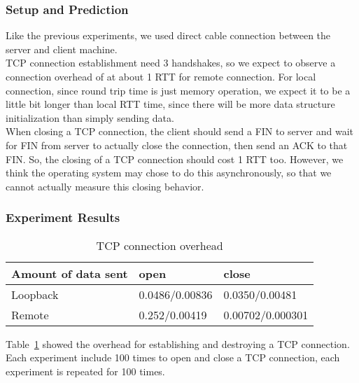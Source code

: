 \documentclass{article} %
\begin{document}
\subsubsection{Setup and Prediction}
Like the previous experiments, we used direct cable connection between the server and client machine.\\
TCP connection establishment need 3 handshakes, so we expect to observe a connection overhead of at about 1 RTT for remote connection. For local connection, since round trip time is just memory operation, we expect it to be a little bit longer than local RTT time, since there will be more data structure initialization than simply sending data.\\
When closing a TCP connection, the client should send a FIN to server and wait
for FIN from server to actually close the connection, then send an ACK to that
FIN\@. So, the closing of a TCP connection should cost 1 RTT too. However, we
think the operating system may chose to do this asynchronously, so that we
cannot actually measure this closing behavior.\\

\subsubsection{Experiment Results}

\begin{table}
  \begin{center}
    \caption{TCP connection overhead}
    \begin{tabular}{|l|l|l|}
      \hline
      Amount of data sent & open           & close            \\ \hline
      Loopback            & 0.0486/0.00836 & 0.0350/0.00481   \\ \hline
      Remote              & 0.252/0.00419  & 0.00702/0.000301 \\ \hline
    \end{tabular}
    \label{table:tcp_overhead}
  \end{center}
\end{table}

Table~\ref{table:tcp_overhead} showed the overhead for establishing and destroying a TCP connection. Each experiment include 100 times to open and close a TCP connection, each experiment is repeated for 100 times.\\
\end{document}
